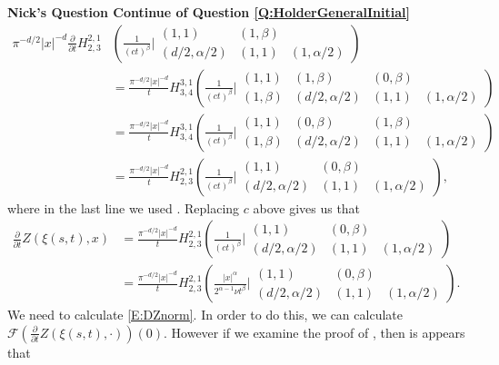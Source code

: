 \documentclass[a4paper,11pt]{article}
\numberwithin{equation}{section}
\theoremstyle{plain}
\theoremstyle{definition}
\newcounter{NQ}
\newenvironment{NickQuestion}[1][] %
{\refstepcounter{NQ}
	\begin{mdframed}[backgroundcolor=lightgray]\textbf{Nick's Question \theNQ \: #1~~}~~~\noindent}%
	{\end{mdframed}}
\numberwithin{NQ}{section}
\numberwithin{LQ}{section}
\numberwithin{ZQ}{section}
\begin{document}
\begin{NickQuestion}[Continue of Question \ref{Q:HolderGeneralInitial}]
	\begin{align*}
	\pi^{-d/2} |x|^{-d} \frac{\partial}{\partial t}  H_{2,3}^{2,1} & \left( \frac{1}{(ct)^\beta} \bigg\vert \begin{matrix} (1,1) & (1,\beta) &
		\\ (d/2,\alpha/2) & (1,1) & (1,\alpha/2) \end{matrix} \right) \\  
		&= \frac{\pi^{-d/2}|x|^{-d} }{t}  H_{3,4}^{3,1}\left( \frac{1}{(ct)^\beta} \bigg\vert \begin{matrix} (1,1) & (1,\beta) & (0, \beta) &
			\\(1,\beta) & (d/2,\alpha/2) & (1,1) & (1,\alpha/2) \end{matrix} \right) \\
		&= \frac{\pi^{-d/2}|x|^{-d} }{t}  H_{3,4}^{3,1}\left( \frac{1}{(ct)^\beta} \bigg\vert \begin{matrix} (1,1) & (0, \beta) & (1,\beta) &
			\\(1,\beta) & (d/2,\alpha/2) & (1,1) & (1,\alpha/2) \end{matrix} \right) \\
		& = \frac{\pi^{-d/2}|x|^{-d} }{t}  H_{2,3}^{2,1}\left( \frac{1}{(ct)^\beta} \bigg\vert \begin{matrix} (1,1) & (0, \beta) &
		\\ (d/2,\alpha/2) & (1,1) & (1,\alpha/2) \end{matrix} \right),
	\end{align*}
where in the last line we used \cite[(2.1.2)]{Kilbas}. Replacing $c$ above gives us that 
	\begin{align*}
		\frac{\partial}{\partial t} Z(\xi(s,t),x) &= \frac{\pi^{-d/2}|x|^{-d} }{t}  H_{2,3}^{2,1}\left( \frac{1}{(ct)^\beta} \bigg\vert \begin{matrix} (1,1) & (0, \beta) &
		\\ (d/2,\alpha/2) & (1,1) & (1,\alpha/2) \end{matrix} \right) \\ 
		& = \frac{\pi^{-d/2}|x|^{-d} }{t}  H_{2,3}^{2,1}\left( \frac{|x|^{\alpha}}{2^{\alpha -1} \nu t^\beta} \bigg\vert \begin{matrix} (1,1) & (0, \beta) &
		\\ (d/2,\alpha/2) & (1,1) & (1,\alpha/2) \end{matrix} \right).
	\end{align*}
We need to calculate \eqref{E:DZnorm}. In order to do this, we can calculate $\mathcal{F} \left( \frac{\partial}{\partial t} Z(\xi(s,t),\cdot) \right)(0)$. However if we examine the proof of \cite[Lemma 4.2]{CHHH16}, then is appears that 

\end{NickQuestion}
\end{document}
